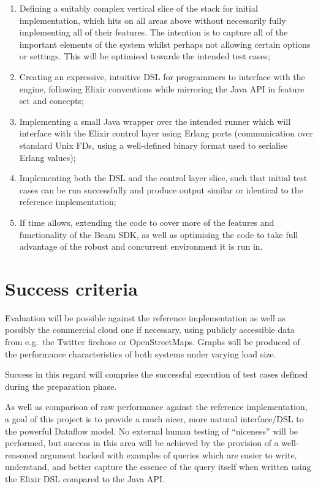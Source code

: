 \documentclass[11pt]{scrartcl}
\begin{document}
\begin{enumerate}
	\item Defining a suitably complex vertical slice of the stack for initial implementation, which hits on all areas above without necessarily fully implementing all of their features. The intention is to capture all of the important elements of the system whilst perhaps not allowing certain options or settings. This will be optimised towards the intended test cases;
	\item Creating an expressive, intuitive DSL for programmers to interface with the engine, following Elixir conventions while mirroring the Java API in feature set and concepts;
	\item Implementing a small Java wrapper over the intended runner which will interface with the Elixir control layer using Erlang ports (communication over standard Unix FDs, using a well-defined binary format used to serialise Erlang values);
	\item Implementing both the DSL and the control layer slice, such that initial test cases can be run successfully and produce output similar or identical to the reference implementation;
	\item If time allows, extending the code to cover more of the features and functionality of the Beam SDK, as well as optimising the code to take full advantage of the robust and concurrent environment it is run in.
\end{enumerate}

\section*{Success criteria}

Evaluation will be possible against the reference implementation as well as possibly the commercial cloud one if necessary, using publicly accessible data from e.g.\ the Twitter firehose or OpenStreetMaps. Graphs will be produced of the performance characteristics of both systems under varying load size.

Success in this regard will comprise the successful execution of test cases defined during the preparation phase.

As well as comparison of raw performance against the reference implementation, a goal of this project is to provide a much nicer, more natural interface/DSL to the powerful Dataflow model. No external human testing of ``niceness'' will be performed, but success in this area will be achieved by the provision of a well-reasoned argument backed with examples of queries which are easier to write, understand, and better capture the essence of the query itself when written using the Elixir DSL compared to the Java API.
\end{document}
